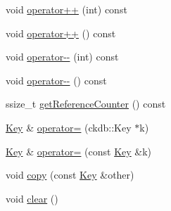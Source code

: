 \begin{DoxyCompactItemize}
void \hyperlink{classkdb_1_1Key_a31f7139c5378b3fde4dfab4955208d23}{operator++} (int) const 
\begin{DoxyCompactList}\small\item\em \end{DoxyCompactList}\item 
void \hyperlink{classkdb_1_1Key_ab017ed5e104e441d86725f61439d1f24}{operator++} () const 
\begin{DoxyCompactList}\small\item\em \end{DoxyCompactList}\item 
void \hyperlink{classkdb_1_1Key_acbb63da4ab49c66c851228511c000ec7}{operator-\/-\/} (int) const 
\begin{DoxyCompactList}\small\item\em \end{DoxyCompactList}\item 
void \hyperlink{classkdb_1_1Key_afa095fe7021b7ca01e6224b976449b3f}{operator-\/-\/} () const 
\begin{DoxyCompactList}\small\item\em \end{DoxyCompactList}\item 
ssize\-\_\-t \hyperlink{classkdb_1_1Key_a213fb46e13b669cc862fce06ac361b79}{get\-Reference\-Counter} () const 
\begin{DoxyCompactList}\small\item\em \end{DoxyCompactList}\item 
\hyperlink{classkdb_1_1Key}{Key} \& \hyperlink{classkdb_1_1Key_a628f3ee543a1d71d4488233018eddd86}{operator=} (ckdb\-::\-Key $\ast$k)
\item 
\hyperlink{classkdb_1_1Key}{Key} \& \hyperlink{classkdb_1_1Key_a63a006c140cfd2a633c6fdf3f9eb9d1a}{operator=} (const \hyperlink{classkdb_1_1Key}{Key} \&k)
\item 
void \hyperlink{classkdb_1_1Key_ab5bc93e22f4cf40b9d2b1fc32cc260be}{copy} (const \hyperlink{classkdb_1_1Key}{Key} \&other)
\begin{DoxyCompactList}\small\item\em \end{DoxyCompactList}\item 
void \hyperlink{classkdb_1_1Key_a33a112681b0b2e94e6d369c0f89e361b}{clear} ()
\begin{DoxyCompactList}\small\item\em \end{DoxyCompactList}\item 

\end{DoxyCompactItemize}
